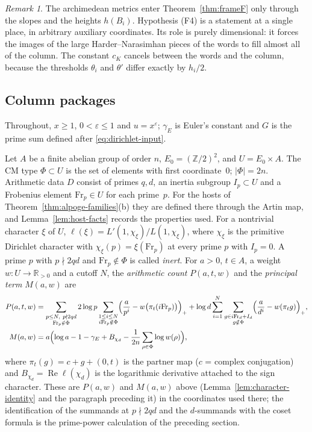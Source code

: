 \documentclass[10pt]{amsart}
\theoremstyle{definition}
\theoremstyle{remark}
\newtheorem{remark}[theorem]{Remark}
\newcommand{\R}{\mathbb R}
\newcommand{\Z}{\mathbb Z}
\newcommand{\Rel}{\operatorname{Re}}
\begin{document}
\begin{remark}\label{rem:F-place-free}
The archimedean metrics enter Theorem~\ref{thm:frameF} only through the slopes and the heights $h(B_i)$. Hypothesis (F4) is a statement at a single place, in arbitrary auxiliary coordinates. Its role is purely dimensional: it forces the images of the large Harder--Narasimhan pieces of the words to fill almost all of the column. The constant $c_K$ cancels between the words and the column, because the thresholds $\theta_i$ and $\theta'$ differ exactly by $h_i/2$.
\end{remark}

\subsection{Column packages}\label{subsec:assembly-dict}
Throughout, $x\ge1$, $0<\varepsilon\le1$ and $u=x^\varepsilon$; $\gamma_E$ is Euler's constant and $G$ is the prime sum defined after \eqref{eq:dirichlet-input}.

Let $A$ be a finite abelian group of
order $n$, $E_0=(\Z/2)^2$, and $U=E_0\times A$. The CM type
$\Phi\subset U$ is the set of elements with first coordinate~$0$; $|\Phi|=2n$. Arithmetic data $D$ consist of primes
$q,d$, an inertia subgroup $I_p\subset U$ and a Frobenius element
$\mathrm{Fr}_p\in U$ for each prime~$p$.
For the hosts of Theorem~\ref{thm:alpoge-families}(b) they are defined there
through the Artin map, and Lemma~\ref{lem:host-facts} records the properties
used. For a nontrivial character $\xi$ of $U$,
$\ell(\xi)=L'(1,\chi_\xi)/L(1,\chi_\xi)$, where $\chi_\xi$ is the primitive
Dirichlet character with $\chi_\xi(p)=\xi(\mathrm{Fr}_p)$ at every prime $p$
with $I_p=0$. A prime $p$ with $p\nmid2qd$ and $\mathrm{Fr}_p\notin\Phi$ is
called \emph{inert}.
For $a>0$, $t\in A$, a weight $w:U\to\R_{>0}$ and a cutoff $N$, the
\emph{arithmetic count} $P(a,t,w)$ and the \emph{principal term} $M(a,w)$
are
\[
\begin{aligned}
 P(a,t,w)&=\sum_{\substack{p\le N,\ p\nmid2qd\\ \mathrm{Fr}_p\notin\Phi}}2\log p
   \sum_{\substack{1\le i\le N\\ i\mathrm{Fr}_p\notin\Phi}}
   \Bigl(\frac a{p^i}-w\bigl(\pi_t(i\mathrm{Fr}_p)\bigr)\Bigr)_+
   +\log d\sum_{i=1}^{N}\sum_{\substack{g\in i\mathrm{Fr}_d+I_d\\ g\notin\Phi}}
   \Bigl(\frac a{d^i}-w(\pi_t g)\Bigr)_+ ,\\
 M(a,w)&=a\Bigl(\log a-1-\gamma_E+B_{\chi_d}-\frac1{2n}\sum_{\rho\in\Phi}\log w(\rho)\Bigr),
\end{aligned}
\]
where $\pi_t(g)=c+g+(0,t)$ is the partner map ($c$ = complex conjugation)
and $B_{\chi_d}=\Rel\ell(\chi_d)$ is the logarithmic derivative attached to the
sign character.
These are $P(a,w)$ and $M(a,w)$ above (Lemma~\ref{lem:character-identity} and the paragraph preceding it) in
the coordinates used there; the identification of the summands at $p\nmid2qd$ and the
$d$-summands with the coset formula is the prime-power calculation of
the preceding section.
\end{document}

